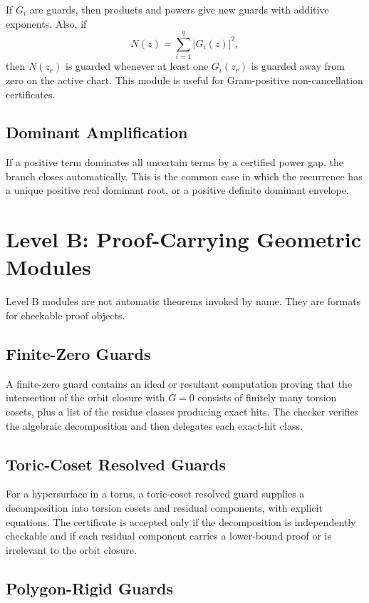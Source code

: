 \documentclass[11pt]{article}
\begin{document}
If \(G_i\) are guards, then products and powers give new guards with additive exponents. Also, if
\[
N(z)=\sum_{i=1}^q |G_i(z)|^2,
\]
then \(N(z_r)\) is guarded whenever at least one \(G_i(z_r)\) is guarded away from zero on the active chart. This module is useful for Gram-positive non-cancellation certificates.

\subsection{Dominant Amplification}

If a positive term dominates all uncertain terms by a certified power gap, the branch closes automatically. This is the common case in which the recurrence has a unique positive real dominant root, or a positive definite dominant envelope.

\section{Level B: Proof-Carrying Geometric Modules}

Level B modules are not automatic theorems invoked by name. They are formats for checkable proof objects.

\subsection{Finite-Zero Guards}

A finite-zero guard contains an ideal or resultant computation proving that the intersection of the orbit closure with \(G=0\) consists of finitely many torsion cosets, plus a list of the residue classes producing exact hits. The checker verifies the algebraic decomposition and then delegates each exact-hit class.

\subsection{Toric-Coset Resolved Guards}

For a hypersurface in a torus, a toric-coset resolved guard supplies a decomposition into torsion cosets and residual components, with explicit equations. The certificate is accepted only if the decomposition is independently checkable and if each residual component carries a lower-bound proof or is irrelevant to the orbit closure.

\subsection{Polygon-Rigid Guards}
\end{document}
